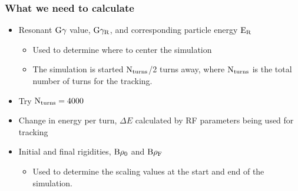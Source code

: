 \documentclass{beamer}
\begin{document}
\begin{frame}
\frametitle{What we need to calculate}

\begin{itemize}
\item Resonant $\rm G\gamma$ value, $\rm G\gamma_R$, and corresponding particle energy $\rm E_R$
\begin{itemize}
\item Used to determine where to center the simulation
\item The simulation is started $\rm N_{turns}$/2 turns away, where $\rm N_{turns}$ is the total number of turns for the tracking. 
\end{itemize}
\item Try $\rm N_{turns}=4000$
\item Change in energy per turn, $\Delta E$ calculated by RF parameters being used for tracking
\item Initial and final rigidities, $\rm B\rho_0$ and $\rm B\rho_F$
\begin{itemize}
\item Used to determine the scaling values at the start and end of the simulation.
\end{itemize}
\end{itemize}
\end{frame}
\end{document}

